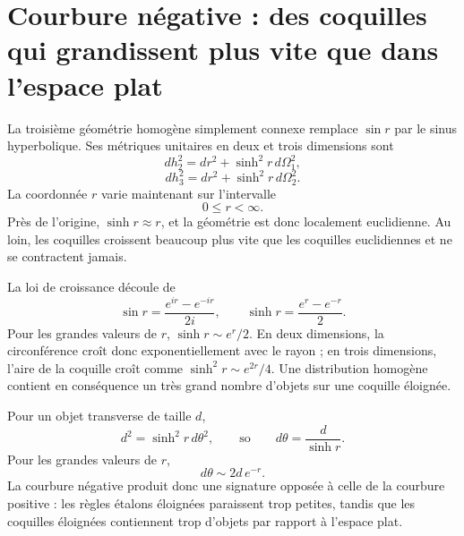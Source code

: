 \section{Courbure négative : des coquilles qui grandissent plus vite que dans l’espace plat}

La troisième géométrie homogène simplement connexe remplace \(\sin r\) par le sinus hyperbolique. Ses métriques unitaires en deux et trois dimensions sont
\begin{equation}
dh_2^2 = dr^2 + \sinh^2 r\, d\Omega_1^2,
\label{eq:c03-hyperbolic-two}
\end{equation}
\begin{equation}
dh_3^2 = dr^2 + \sinh^2 r\, d\Omega_2^2.
\label{eq:c03-hyperbolic-three}
\end{equation}
La coordonnée \(r\) varie maintenant sur l’intervalle
\begin{equation}
0\le r<\infty.
\end{equation}
Près de l’origine, \(\sinh r\approx r\), et la géométrie est donc localement euclidienne. Au loin, les coquilles croissent beaucoup plus vite que les coquilles euclidiennes et ne se contractent jamais.

La loi de croissance découle de
\begin{equation}
\sin r = \frac{e^{ir}-e^{-ir}}{2i},
\qquad
\sinh r = \frac{e^r-e^{-r}}{2}.
\label{eq:c03-sin-sinh}
\end{equation}
Pour les grandes valeurs de \(r\), \(\sinh r\sim e^r/2\). En deux dimensions, la circonférence croît donc exponentiellement avec le rayon ; en trois dimensions, l’aire de la coquille croît comme \(\sinh^2r\sim e^{2r}/4\). Une distribution homogène contient en conséquence un très grand nombre d’objets sur une coquille éloignée.

Pour un objet transverse de taille \(d\),
\begin{equation}
d^2 = \sinh^2 r\, d\theta^2,
\qquad\text{so}\qquad
d\theta = \frac{d}{\sinh r}.
\label{eq:c03-hyperbolic-angle}
\end{equation}
Pour les grandes valeurs de \(r\),
\begin{equation}
d\theta \sim 2d\,e^{-r}.
\end{equation}
La courbure négative produit donc une signature opposée à celle de la courbure positive : les règles étalons éloignées paraissent trop petites, tandis que les coquilles éloignées contiennent trop d’objets par rapport à l’espace plat.

\begin{classroomqa}
\end{classroomqa}

